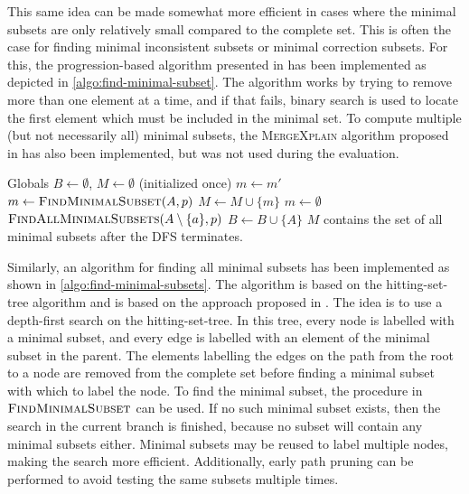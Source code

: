 This same idea can be made somewhat more efficient in cases where the minimal subsets are only relatively small compared to the complete set. This is often the case for finding minimal inconsistent subsets or minimal correction subsets. For this, the progression-based algorithm presented in \cite{marques2013minimal} has been implemented as depicted in \cref{algo:find-minimal-subset}. The algorithm works by trying to remove more than one element at a time, and if that fails, binary search is used to locate the first element which must be included in the minimal set.
To compute multiple (but not necessarily all) minimal subsets, the \textsc{MergeXplain} algorithm proposed in \cite{shchekotykhin2015mergexplain} has also been implemented, but was not used during the evaluation.

\begin{algorithm}[ht]
  \begin{algorithmic}
    \State Globals \enspace $B \gets \emptyset$, \enspace $M \gets \emptyset$ \quad (initialized once)
        \State $m \gets m'$
        \State $m \gets \textsc{FindMinimalSubset}(A, p)$
        \State $M \gets M \cup \{ m \}$
      \Else
        \State $m \gets \emptyset$
      \EndIf
        \State $\textsc{FindAllMinimalSubsets}(A \setminus \{ a \}, p)$
      \EndFor
      \State $B \gets B \cup \{ A \}$
    \EndIf
    \State $M$ contains the set of all minimal subsets after the DFS terminates.
  \end{algorithmic}
  \caption{$\textsc{FindAllMinimalSubsets}(A, p)$}
  \label{algo:find-minimal-subsets}
\end{algorithm}

Similarly, an algorithm for finding all minimal subsets has been implemented as shown in \cref{algo:find-minimal-subsets}. The algorithm is based on the hitting-set-tree algorithm \cite{reiter1987theory} and is based on the approach proposed in \cite{kalyanpur2007finding}. The idea is to use a depth-first search on the hitting-set-tree. In this tree, every node is labelled with a minimal subset, and every edge is labelled with an element of the minimal subset in the parent. The elements labelling the edges on the path from the root to a node are removed from the complete set before finding a minimal subset with which to label the node. To find the minimal subset, the procedure in $\textsc{FindMinimalSubset}$ can be used. If no such minimal subset exists, then the search in the current branch is finished, because no subset will contain any minimal subsets either. Minimal subsets may be reused to label multiple nodes, making the search more efficient. Additionally, early path pruning can be performed to avoid testing the same subsets multiple times.

